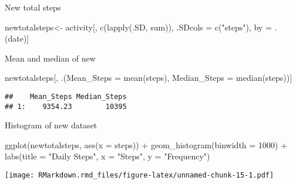 \documentclass[
]{article}
\newenvironment{Shaded}{\begin{snugshade}}{\end{snugshade}}
\newcommand{\AttributeTok}[1]{\textcolor[rgb]{0.77,0.63,0.00}{#1}}
\newcommand{\DecValTok}[1]{\textcolor[rgb]{0.00,0.00,0.81}{#1}}
\newcommand{\FunctionTok}[1]{\textcolor[rgb]{0.00,0.00,0.00}{#1}}
\newcommand{\NormalTok}[1]{#1}
\newcommand{\OtherTok}[1]{\textcolor[rgb]{0.56,0.35,0.01}{#1}}
\newcommand{\SpecialCharTok}[1]{\textcolor[rgb]{0.00,0.00,0.00}{#1}}
\newcommand{\StringTok}[1]{\textcolor[rgb]{0.31,0.60,0.02}{#1}}
\begin{document}
New total steps

\begin{Shaded}
\begin{Highlighting}[]
\NormalTok{newtotalsteps}\OtherTok{\textless{}{-}}\NormalTok{ activity[, }\FunctionTok{c}\NormalTok{(}\FunctionTok{lapply}\NormalTok{(.SD, sum)), .SDcols }\OtherTok{=} \FunctionTok{c}\NormalTok{(}\StringTok{"steps"}\NormalTok{), by }\OtherTok{=}\NormalTok{ .(date)] }
\end{Highlighting}
\end{Shaded}

Mean and median of new

\begin{Shaded}
\begin{Highlighting}[]
\NormalTok{newtotalsteps[, .(}\AttributeTok{Mean\_Steps =} \FunctionTok{mean}\NormalTok{(steps), }\AttributeTok{Median\_Steps =} \FunctionTok{median}\NormalTok{(steps))]}
\end{Highlighting}
\end{Shaded}

\begin{verbatim}
##    Mean_Steps Median_Steps
## 1:    9354.23        10395
\end{verbatim}

Histogram of new dataset

\begin{Shaded}
\begin{Highlighting}[]
\FunctionTok{ggplot}\NormalTok{(newtotalsteps, }\FunctionTok{aes}\NormalTok{(}\AttributeTok{x =}\NormalTok{ steps)) }\SpecialCharTok{+} \FunctionTok{geom\_histogram}\NormalTok{(}\AttributeTok{binwidth =} \DecValTok{1000}\NormalTok{) }\SpecialCharTok{+} \FunctionTok{labs}\NormalTok{(}\AttributeTok{title =} \StringTok{"Daily Steps"}\NormalTok{, }\AttributeTok{x =} \StringTok{"Steps"}\NormalTok{, }\AttributeTok{y =} \StringTok{"Frequency"}\NormalTok{)}
\end{Highlighting}
\end{Shaded}

\texttt{[image: RMarkdown.rmd\_files/figure-latex/unnamed-chunk-15-1.pdf]}
\end{document}
